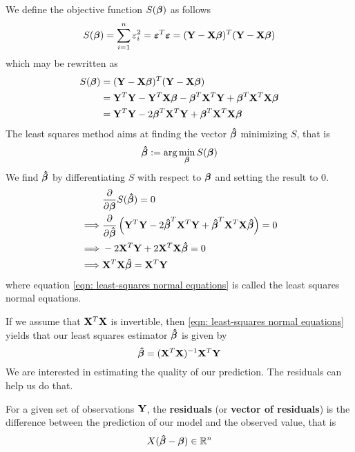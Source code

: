 We define the objective function \( S(\boldsymbol{\beta}) \) as follows
\begin{equation}
    \label{eqn: least squares objective function}
    S(\boldsymbol{\beta}) = \sum_{i=1}^{n} \varepsilon_{i}^{2} = \boldsymbol{\varepsilon}^{T} \boldsymbol{\varepsilon} = (\mathbf{Y}-\mathbf{X} \boldsymbol{\beta})^{T}(\mathbf{Y}-\mathbf{X} \boldsymbol{\beta})
\end{equation}
which may be rewritten as
\begin{align*}
    S(\boldsymbol{\beta}) & = (\mathbf{Y} - \mathbf{X} \boldsymbol{\beta})^{T} (\mathbf{Y} - \mathbf{X} \boldsymbol{\beta})                             \\
            & = \mathbf{Y}^T \mathbf{Y} - \mathbf{Y}^T \mathbf{X} \boldsymbol{\beta} - \boldsymbol{\beta}^T \mathbf{X}^T \mathbf{Y} + \boldsymbol{\beta}^T \mathbf{X}^T \mathbf{X} \boldsymbol{\beta} \\
            & = \mathbf{Y}^T \mathbf{Y} - 2 \boldsymbol{\beta}^T \mathbf{X}^T \mathbf{Y} + \boldsymbol{\beta}^T \mathbf{X}^T \mathbf{X} \boldsymbol{\beta}              \\
\end{align*}
The least squares method aims at finding the vector $\boldsymbol{\hat{\beta}}$ minimizing \( S \), that is
\[
    \boldsymbol{\hat{\beta}} := \arg \min_{\boldsymbol{\beta}} S(\boldsymbol{\beta})
\]
We find \( \boldsymbol{\hat{\beta}} \) by differentiating \( S \) with respect to $\boldsymbol{\beta}$ and setting the result to 0.
\begin{align}
             & \frac{\partial}{\partial \boldsymbol{\beta}} S(\boldsymbol{\hat{\beta}}) = 0 \nonumber                                                                  \\
    \implies & \frac{\partial}{\partial \boldsymbol{\hat{\beta}}} \left( \mathbf{Y}^T \mathbf{Y} - 2 \boldsymbol{\hat{\beta}}^T \mathbf{X}^T \mathbf{Y} + \boldsymbol{\hat{\beta}}^T \mathbf{X}^T \mathbf{X} \boldsymbol{\hat{\beta}} \right) = 0 \nonumber \\
    \implies & - 2 \mathbf{X}^T \mathbf{Y} + 2 \mathbf{X}^T \mathbf{X} \boldsymbol{\hat{\beta}} = 0 \nonumber                                                                            \\
    \implies & \mathbf{X}^T \mathbf{X} \boldsymbol{\hat{\beta}} = \mathbf{X}^T \mathbf{Y} \label{eqn: least-squares normal equations}
\end{align}
where equation \eqref{eqn: least-squares normal equations} is called the least squares normal equations.

If we assume that \( \mathbf{X}^T \mathbf{X} \) is invertible, then \eqref{eqn: least-squares normal equations} yields that our least squares estimator \( \boldsymbol{\hat{\beta}} \) is given by
\begin{equation}
    \label{eqn: least squares estimator}
    \boldsymbol{\hat{\beta}} = (\mathbf{X}^T \mathbf{X})^{-1} \mathbf{X}^T \mathbf{Y}
\end{equation}
We are interested in estimating the quality of our prediction. The residuals can help us do that.
\begin{definition}[Residuals]
    For a given set of observations \(\mathbf{Y}\), the \textbf{residuals} (or \textbf{vector of residuals}) is the difference between the prediction of our model and the observed value, that is
    \[
        X (\boldsymbol{\hat{\beta}} - \boldsymbol{\beta}) \in \mathbb{R}^n
    \]
\end{definition}

